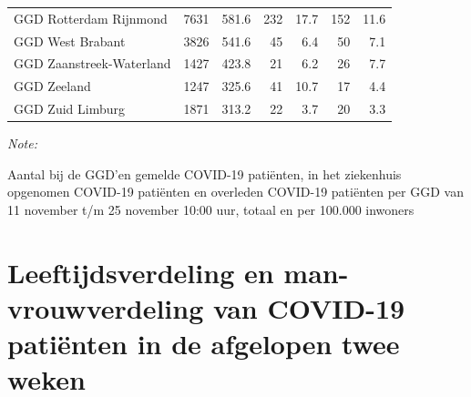 \documentclass[
  english,
  man,floatsintext]{apa6}
\begin{document}
\begin{table}[H]
\begin{threeparttable}
\begin{tabular}{lrrrrrr}
GGD Rotterdam Rijnmond & 7631 & 581.6 & 232 & 17.7 & 152 & 11.6\\
GGD West Brabant & 3826 & 541.6 & 45 & 6.4 & 50 & 7.1\\
GGD Zaanstreek-Waterland & 1427 & 423.8 & 21 & 6.2 & 26 & 7.7\\
GGD Zeeland & 1247 & 325.6 & 41 & 10.7 & 17 & 4.4\\
GGD Zuid Limburg & 1871 & 313.2 & 22 & 3.7 & 20 & 3.3\\
\bottomrule
\end{tabular}
\begin{tablenotes}
\item \textit{Note: } 
\item Aantal bij de GGD’en gemelde COVID-19 patiënten, in het ziekenhuis opgenomen COVID-19 patiënten en overleden COVID-19 patiënten per GGD van 11 november t/m 25 november 10:00 uur, totaal en per 100.000 inwoners
\end{tablenotes}
\end{threeparttable}
\endgroup{}
\end{table}

\newpage

\hypertarget{leeftijdsverdeling-en-man-vrouwverdeling-van-covid-19-patiuxebnten-in-de-afgelopen-twee-weken}{%
\section{Leeftijdsverdeling en man-vrouwverdeling van COVID-19 patiënten in de afgelopen twee weken}\label{leeftijdsverdeling-en-man-vrouwverdeling-van-covid-19-patiuxebnten-in-de-afgelopen-twee-weken}}
\end{document}
